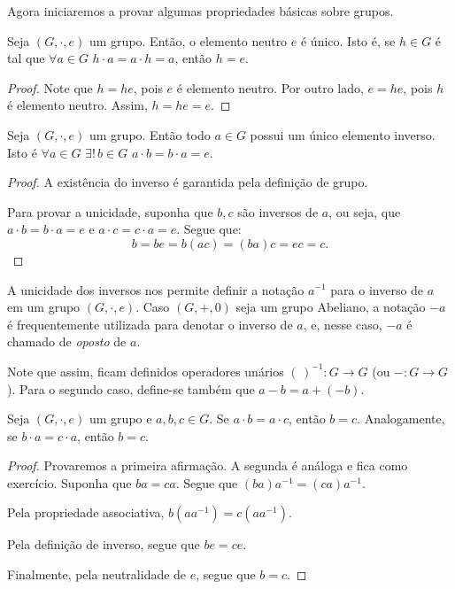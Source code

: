 Agora iniciaremos a provar algumas propriedades básicas sobre grupos.
\begin{prop}\label{prop:group_uniqueNeutral}
    Seja $(G,\cdot,e)$ um grupo.
    Então, o elemento neutro $e$ é único.
    Isto é, se $h \in G$ é tal que $\forall a \in G$ $h \cdot a = a \cdot h = a$, então $h = e$.
\end{prop}
\begin{proof}
    Note que $h=he$, pois $e$ é elemento neutro.
    Por outro lado, $e=he$, pois $h$ é elemento neutro.
    Assim, $h=he=e$.
\end{proof}

\begin{prop}\label{prop:group_uniqueInverse}
    Seja $(G,\cdot,e)$ um grupo.
    Então todo $a \in G$ possui um único elemento inverso.
Isto é $\forall a \in G$ $\exists!\, b \in G$ $a \cdot b = b \cdot a = e$.
\end{prop}
\begin{proof}
    A existência do inverso é garantida pela definição de grupo.
    
    Para provar a unicidade, suponha que $b, c$ são inversos de $a$, ou seja, que $a \cdot b = b \cdot a = e$ e $a \cdot c = c \cdot a = e$.
    Segue que:
    $$b=be=b(ac)=(ba)c=ec=c.$$
\end{proof}

A unicidade dos inversos nos permite definir a notação $a^{-1}$ para o inverso de $a$ em um grupo $(G,\cdot,e)$.
Caso $(G, +, 0)$ seja um grupo Abeliano, a notação $-a$ é frequentemente utilizada para denotar o inverso de $a$, e, nesse caso, $-a$ é chamado de \emph{oposto} de $a$.

Note que assim, ficam definidos operadores unários $(\,)^{-1}:G\rightarrow G$ (ou $-:G\rightarrow G$).
Para o segundo caso, define-se também que $a-b=a+(-b)$.

\begin{prop}[Cancelamento]\label{prop:group_cancel}
    Seja $(G,\cdot,e)$ um grupo e $a,b,c \in G$.
    Se $a \cdot b = a \cdot c$, então $b=c$.
    Analogamente, se $b \cdot a = c \cdot a$, então $b=c$.
\end{prop}
\begin{proof}
    Provaremos a primeira afirmação.
    A segunda é análoga e fica como exercício.
    Suponha que $ba=ca$.
    Segue que $(ba)a^{-1}=(ca)a^{-1}$.
    
    Pela propriedade associativa, $b(aa^{-1})=c(aa^{-1})$.

    Pela definição de inverso, segue que $be=ce$.

    Finalmente, pela neutralidade de $e$, segue que $b=c$.
\end{proof}

